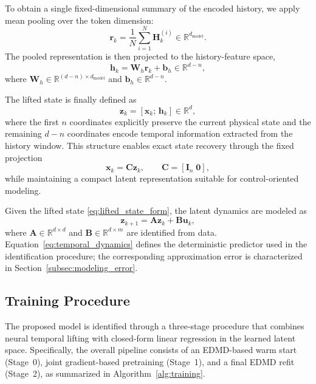 \documentclass[journal]{IEEEtran}
\newcommand{\vx}{\mathbf{x}}
\newcommand{\vu}{\mathbf{u}}
\newcommand{\vz}{\mathbf{z}}
\newcommand{\vh}{\mathbf{h}}
\newcommand{\vr}{\mathbf{r}}
\newcommand{\vb}{\mathbf{b}}
\newcommand{\mA}{\mathbf{A}}
\newcommand{\mB}{\mathbf{B}}
\newcommand{\mC}{\mathbf{C}}
\newcommand{\mW}{\mathbf{W}}
\newcommand{\mH}{\mathbf{H}}
\newcommand{\mI}{\mathbf{I}}
\begin{document}
To obtain a single fixed-dimensional summary of the encoded history, we apply mean pooling over the token dimension:
\begin{equation}
    \vr_k = \frac{1}{N}\sum_{i=1}^{N} \mH_k^{(i)} \in \mathbb{R}^{d_{\mathrm{model}}}.
    \label{eq:pooling}
\end{equation}
The pooled representation is then projected to the history-feature space,
\begin{equation}
    \vh_k = \mW_h \vr_k + \vb_h \in \mathbb{R}^{d-n},
    \label{eq:history_feature}
\end{equation}
where $\mW_h \in \mathbb{R}^{(d-n)\times d_{\mathrm{model}}}$ and $\vb_h \in \mathbb{R}^{d-n}$.

The lifted state is finally defined as
\begin{equation}
    \vz_k = [\vx_k;\,\vh_k] \in \mathbb{R}^{d},
    \label{eq:lifted_state_form}
\end{equation}
where the first $n$ coordinates explicitly preserve the current physical state and the remaining $d-n$ coordinates encode temporal information extracted from the history window. This structure enables exact state recovery through the fixed projection
\begin{equation}
    \vx_k = \mC \vz_k, \qquad \mC = [\mI_n\;\mathbf{0}],
    \label{eq:decoder_projection}
\end{equation}
while maintaining a compact latent representation suitable for control-oriented modeling.

Given the lifted state \eqref{eq:lifted_state_form}, the latent dynamics are modeled as
\begin{equation}
    \vz_{k+1} = \mA \vz_k + \mB \vu_k,
    \label{eq:temporal_dynamics}
\end{equation}
where $\mA \in \mathbb{R}^{d\times d}$ and $\mB \in \mathbb{R}^{d\times m}$ are identified from data. Equation~\eqref{eq:temporal_dynamics} defines the deterministic predictor used in the identification procedure; the corresponding approximation error is characterized in Section~\ref{subsec:modeling_error}.

\subsection{Training Procedure}
\label{sec:training}

The proposed model is identified through a three-stage procedure that combines neural temporal lifting with closed-form linear regression in the learned latent space. Specifically, the overall pipeline consists of an EDMD-based warm start (Stage~0), joint gradient-based pretraining (Stage~1), and a final EDMD refit (Stage~2), as summarized in Algorithm~\ref{alg:training}.
\end{document}
